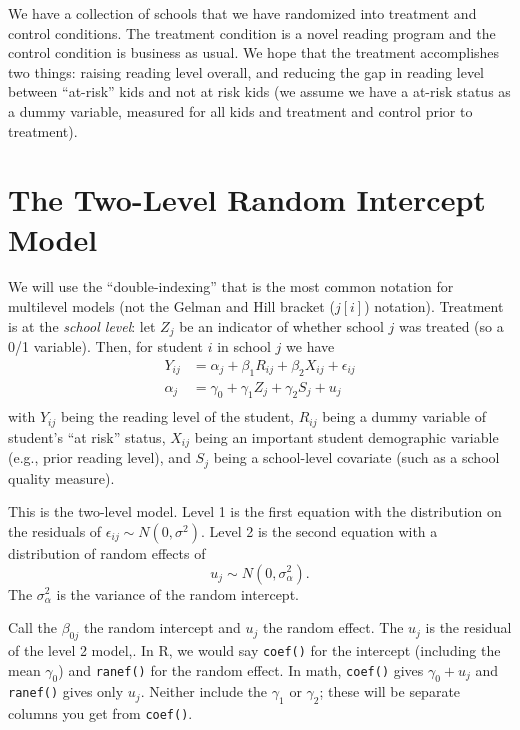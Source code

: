 \documentclass[
  letterpaper,
  DIV=11,
  numbers=noendperiod]{scrreprt}
\begin{document}
We have a collection of schools that we have randomized into treatment
and control conditions. The treatment condition is a novel reading
program and the control condition is business as usual. We hope that the
treatment accomplishes two things: raising reading level overall, and
reducing the gap in reading level between ``at-risk'' kids and not at
risk kids (we assume we have a at-risk status as a dummy variable,
measured for all kids and treatment and control prior to treatment).

\hypertarget{the-two-level-random-intercept-model}{%
\section{The Two-Level Random Intercept
Model}\label{the-two-level-random-intercept-model}}

We will use the ``double-indexing'' that is the most common notation for
multilevel models (not the Gelman and Hill bracket (\(j[i]\)) notation).
Treatment is at the \emph{school level}: let \(Z_j\) be an indicator of
whether school \(j\) was treated (so a 0/1 variable). Then, for student
\(i\) in school \(j\) we have \[\begin{aligned}
Y_{ij} &= \alpha_{j} + \beta_{1} R_{ij} + \beta_{2} X_{ij} + \epsilon_{ij} \\
\alpha_{j} &= \gamma_{0} + \gamma_{1} Z_{j} + \gamma_{2} S_{j} + u_{j} \\
\end{aligned}\] with \(Y_{ij}\) being the reading level of the student,
\(R_{ij}\) being a dummy variable of student's ``at risk'' status,
\(X_{ij}\) being an important student demographic variable (e.g., prior
reading level), and \(S_j\) being a school-level covariate (such as a
school quality measure).

This is the two-level model. Level 1 is the first equation with the
distribution on the residuals of
\(\epsilon_{ij} \sim N( 0, \sigma^2 )\). Level 2 is the second equation
with a distribution of random effects of
\[u_{j} \sim N( 0, \sigma^2_\alpha ) .\] The \(\sigma^2_\alpha\) is the
variance of the random intercept.

Call the \(\beta_{0j}\) the random intercept and \(u_{j}\) the random
effect. The \(u_{j}\) is the residual of the level 2 model,. In R, we
would say \texttt{coef()} for the intercept (including the mean
\(\gamma_0\)) and \texttt{ranef()} for the random effect. In math,
\texttt{coef()} gives \(\gamma_0 + u_j\) and \texttt{ranef()} gives only
\(u_j\). Neither include the \(\gamma_1\) or \(\gamma_2\); these will be
separate columns you get from \texttt{coef()}.
\end{document}
